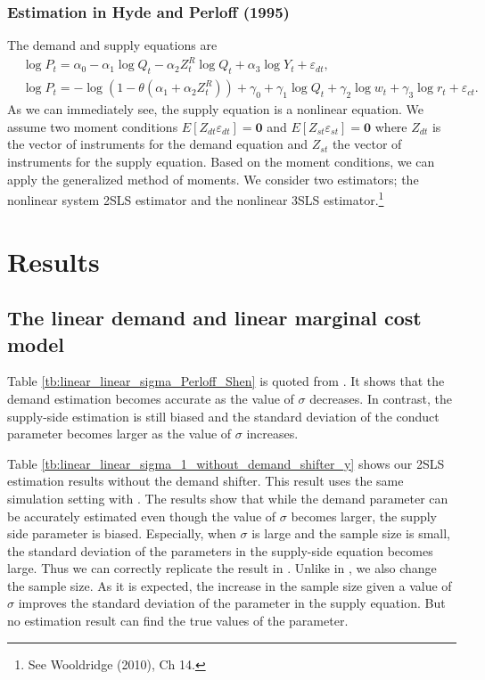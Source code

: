 \documentclass[11pt, a4paper]{article}
\begin{document}
\subsubsection{Estimation in Hyde and Perloff (1995)}
The demand and supply equations are
\begin{align}
    &\log P_{t} = \alpha_0 - \alpha_1 \log Q_t - \alpha_2 Z^R_t\log Q_t + \alpha_3 \log Y_t + \varepsilon_{dt},\\
    &\log P_t  = - \log(1 - \theta(\alpha_1 + \alpha_2 Z^R_t)) + \gamma_0 + \gamma_1 \log Q_t +  \gamma_2 \log w_t + \gamma_3 \log r_t + \varepsilon_{ct}.
\end{align}
As we can immediately see, the supply equation is a nonlinear equation.
We assume two moment conditions $E[Z_{dt} \varepsilon_{dt}] = \bm0 $ and $ E[Z_{st} \varepsilon_{st}] =\bm0$ where $Z_{dt}$ is the vector of instruments for the demand equation and $Z_{st}$ the vector of instruments for the supply equation.
Based on the moment conditions, we can apply the generalized method of moments.
We consider two estimators; the nonlinear system 2SLS estimator and the nonlinear 3SLS estimator.\footnote{See Wooldridge (2010), Ch 14.}



\section{Results}


\subsection{The linear demand and linear marginal cost model}
Table \ref{tb:linear_linear_sigma_Perloff_Shen} is quoted from \cite{perloff2012collinearity}.
It shows that the demand estimation becomes accurate as the value of $\sigma$ decreases.
In contrast, the supply-side estimation is still biased and the standard deviation of the conduct parameter becomes larger as the value of $\sigma$ increases.

Table \ref{tb:linear_linear_sigma_1_without_demand_shifter_y} shows our 2SLS estimation results without the demand shifter. 
This result uses the same simulation setting with \citet{perloff2012collinearity}.
The results show that while the demand parameter can be accurately estimated even though the value of $\sigma$ becomes larger, the supply side parameter is biased.
Especially, when $\sigma$ is large and the sample size is small, the standard deviation of the parameters in the supply-side equation becomes large.
Thus we can correctly replicate the result in \citet{perloff2012collinearity}.
Unlike in \cite{perloff2012collinearity}, we also change the sample size.
As it is expected, the increase in the sample size given a value of $\sigma$ improves the standard deviation of the parameter in the supply equation. 
But no estimation result can find the true values of the parameter.
\end{document}
